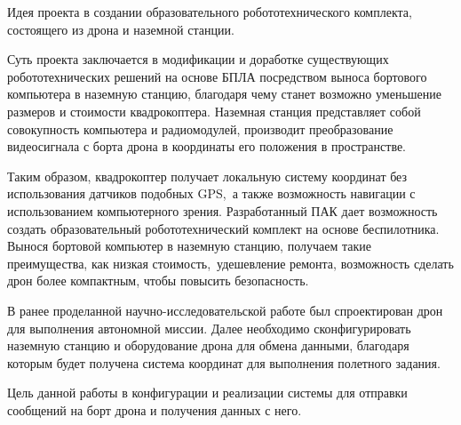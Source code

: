 
Идея проекта в создании образовательного робототехнического комплекта, состоящего из дрона и наземной станции. 

Суть проекта заключается в модификации и доработке существующих робототехнических решений на основе БПЛА посредством выноса бортового компьютера в наземную станцию, благодаря чему станет возможно уменьшение размеров и стоимости квадрокоптера.
Наземная станция представляет собой совокупность компьютера и радиомодулей, производит преобразование видеосигнала с борта дрона в координаты его положения в пространстве.

Таким образом, квадрокоптер получает локальную систему координат без использования датчиков подобных GPS, а также возможность навигации с использованием компьютерного зрения.
Разработанный ПАК дает возможность создать образовательный робототехнический комплект на основе беспилотника. Вынося бортовой компьютер в наземную станцию, получаем такие преимущества, как низкая стоимость, удешевление ремонта, возможность сделать дрон более компактным, чтобы повысить безопасность.

В ранее проделанной научно-исследовательской работе был спроектирован дрон для выполнения автономной миссии. Далее необходимо сконфигурировать наземную станцию и оборудование дрона для обмена данными, благодаря которым будет получена система координат для выполнения полетного задания.

Цель данной работы в конфигурации и реализации системы для отправки сообщений на борт дрона и получения данных с него.